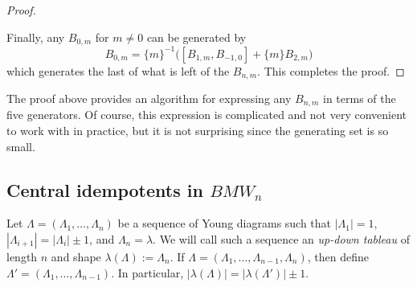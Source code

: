 \begin{proof}
\begin{center}
\end{center}

Finally, any $B_{0,m}$ for $m \neq 0$ can be generated by
\[
    B_{0,m} = \{ m \}^{-1} \Big( [B_{1,m}, B_{-1,0}] + \{ m \} B_{2,m} \Big)
\]
which generates the last of what is left of the $B_{n,m}$. This completes the proof.
\end{proof}

\begin{remark}
The proof above provides an algorithm for expressing any $B_{n,m}$ in terms of the five generators. Of course, this expression is complicated and not very convenient to work with in practice, but it is not surprising since the generating set is so small. 
\end{remark}








\subsection{Central idempotents in $BMW_n$}

Let $\Lambda = (\Lambda_1, \dots, \Lambda_n)$ be a sequence of Young diagrams such that $|\Lambda_1|=1$, $|\Lambda_{i+1}| = |\Lambda_{i}| \pm 1$, and $\Lambda_n=\lambda$. 
We will call such a sequence an \textit{up-down tableau} of length $n$ and shape $\lambda(\Lambda) := \Lambda_n$. 
If $\Lambda = (\Lambda_1, \dots, \Lambda_{n-1}, \Lambda_n)$, then define $\Lambda' = (\Lambda_1, \dots, \Lambda_{n-1})$. 
In particular, $|\lambda(\Lambda)| = |\lambda(\Lambda')| \pm 1$. 

